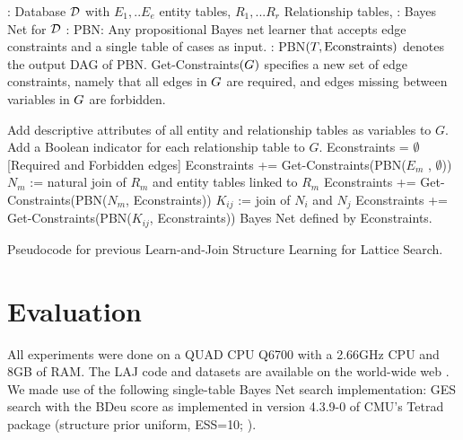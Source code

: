 \documentclass{article}
\begin{document}
\begin{algorithm}[htb]
\begin{algorithmic}
{\footnotesize
{}: Database $\mathcal{D}$ with $E_1,..E_e$ entity tables, $R_1,... R_r$ Relationship tables, %
: Bayes Net for $\mathcal{D}$ 
: PBN: Any propositional Bayes net learner that accepts edge constraints and a single table of cases as input. 
: PBN$(T,\mbox{Econstraints})$ denotes the output DAG of PBN. Get-Constraints$(G)$ specifies a new set of edge constraints, namely that all edges in $G$ are required, and edges missing between variables in $G$ are forbidden.
} %
\end{algorithmic}
\begin{algorithmic}[1]
{\footnotesize
	\STATE Add descriptive attributes of all entity and relationship tables as variables to  $G$. Add a Boolean indicator for each relationship table to $G$.
	\STATE Econstraints = $\emptyset$ {[Required and Forbidden edges]} %
	\STATE Econstraints += Get-Constraints(PBN($E_m$ , $\emptyset$)) 
	\ENDFOR	
{}
	\STATE $N_m$ :=  natural 
	join of $R_m$ and entity tables linked to $R_m$ 
	\STATE Econstraints += Get-Constraints(PBN($N_m$, Econstraints))
\ENDFOR
{}
	\STATE $K_{ij}$ :=  %
	join of $N_i$ and $N_j$ 
	\STATE Econstraints += Get-Constraints(PBN($K_{ij}$, Econstraints))
\ENDFOR
\RETURN Bayes Net defined by Econstraints.
		} %
\end{algorithmic}
\caption{Pseudocode for previous Learn-and-Join Structure Learning for Lattice Search. \label{alg:structure}}
\end{algorithm}


\section{Evaluation} 
All experiments were done on a QUAD CPU Q6700 with a 2.66GHz CPU and 8GB of RAM. The LAJ code and datasets are available on the world-wide web \cite{bib:jbnsite}. We made use of the following single-table Bayes Net search implementation:  GES search \cite{Chickering2003} with the BDeu score as implemented in version 4.3.9-0 of CMU's Tetrad package (structure prior uniform, ESS=10; \cite{2008a}).
\end{document}
